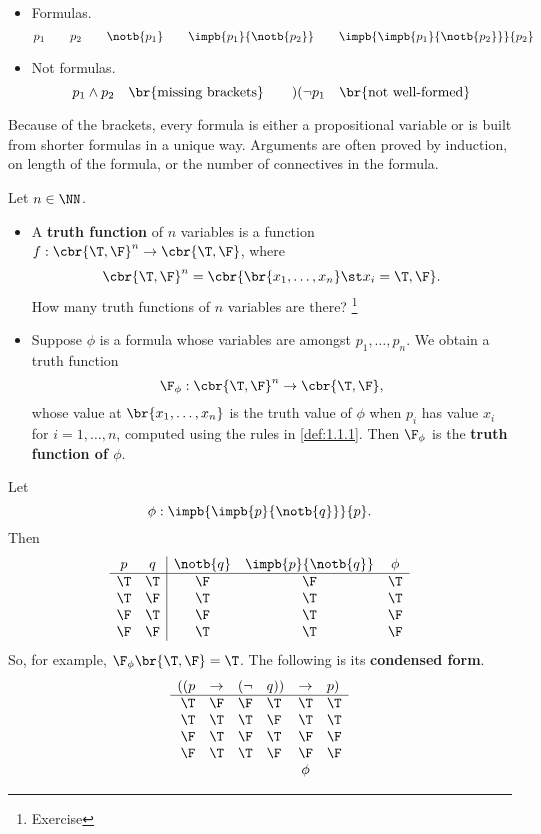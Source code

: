 \pagebreak

\begin{example*}
\hfill
\begin{itemize}
\item Formulas.
$$ p_1 \qquad p_2 \qquad \notb{p_1} \qquad \impb{p_1}{\notb{p_2}} \qquad \impb{\impb{p_1}{\notb{p_2}}}{p_2} $$
\item Not formulas.
$$ p_1 \land p_2 \quad \br{\text{missing brackets}} \qquad )( \neg p_1 \quad \br{\text{not well-formed}} $$
\end{itemize}
\end{example*}

Because of the brackets, every formula is either a propositional variable or is built from shorter formulas in a unique way. Arguments are often proved by induction, on length of the formula, or the number of connectives in the formula.

\begin{definition}
Let $ n \in \NN $.
\begin{itemize}
\item A \textbf{truth function} of $ n $ variables is a function $ f : \cbr{\T, \F}^n \to \cbr{\T, \F} $, where
$$ \cbr{\T, \F}^n = \cbr{\br{x_1, \dots, x_n} \st x_i = \T, \F}. $$
How many truth functions of $ n $ variables are there? \footnote{Exercise}
\item Suppose $ \phi $ is a formula whose variables are amongst $ p_1, \dots, p_n $. We obtain a truth function
$$ \F_\phi : \cbr{\T, \F}^n \to \cbr{\T, \F}, $$
whose value at $ \br{x_1, \dots, x_n} $ is the truth value of $ \phi $ when $ p_i $ has value $ x_i $ for $ i = 1, \dots, n $, computed using the rules in \ref{def:1.1.1}. Then $ \F_\phi $ is the \textbf{truth function of $ \phi $}.
\end{itemize}
\end{definition}

\begin{example*}
Let
$$ \phi : \impb{\impb{p}{\notb{q}}}{p}. $$
Then
$$
\begin{array}{cc|ccc}
p & q & \notb{q} & \impb{p}{\notb{q}} & \phi \\
\hline
\T & \T & \F & \F & \T \\
\T & \F & \T & \T & \T \\
\F & \T & \F & \T & \F \\
\F & \F & \T & \T & \F
\end{array}
$$
So, for example, $ \F_\phi\br{\T, \F} = \T $. The following is its \textbf{condensed form}.
$$
\begin{array}{rcrlcl}
((p & \rightarrow & (\neg & q)) & \rightarrow & p) \\
\hline
\T & \F & \F & \T & \T & \T \\
\T & \T & \T & \F & \T & \T \\
\F & \T & \F & \T & \F & \F \\
\F & \T & \T & \F & \F & \F \\
& & & & \phi &
\end{array}
$$
\end{example*}

